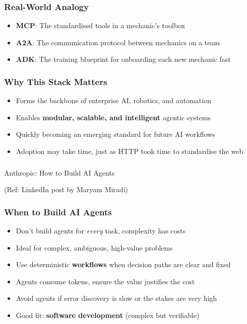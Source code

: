 \begin{frame}[fragile]\frametitle{Real-World Analogy}
    \begin{itemize}
        \item \textbf{MCP}: The standardised tools in a mechanic's toolbox
        \item \textbf{A2A}: The communication protocol between mechanics on a team
        \item \textbf{ADK}: The training blueprint for onboarding each new mechanic fast
    \end{itemize}
\end{frame}

\begin{frame}[fragile]\frametitle{Why This Stack Matters}
    \begin{itemize}
        \item Forms the backbone of enterprise AI, robotics, and automation
        \item Enables \textbf{modular, scalable, and intelligent} agentic systems
        \item Quickly becoming an emerging standard for future AI workflows
        \item Adoption may take time, just as HTTP took time to standardise the web
    \end{itemize}
\end{frame}


\begin{frame}[fragile]\frametitle{}
\begin{center}
{\Large Anthropic: How to Build AI Agents}

{\tiny (Ref: LinkedIn post by Maryam Miradi)}
\end{center}
\end{frame}

\begin{frame}[fragile]\frametitle{When to Build AI Agents}
    \begin{itemize}
        \item Don't build agents for \emph{every} task, complexity has costs
        \item Ideal for complex, ambiguous, high-value problems
        \item Use deterministic \textbf{workflows} when decision paths are clear and fixed
        \item Agents consume tokens, ensure the value justifies the cost
        \item Avoid agents if error discovery is slow or the stakes are very high
        \item Good fit: \textbf{software development} (complex but verifiable)
    \end{itemize}
\end{frame}

